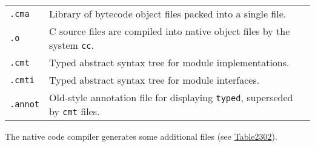 \begin{longtable}[]{@{}ll@{}}
\begin{minipage}[t]{0.52\columnwidth}\raggedright
\passthrough{\lstinline!.cma!}\strut
\end{minipage} & \begin{minipage}[t]{0.42\columnwidth}\raggedright
Library of bytecode object files packed into a single file.\strut
\end{minipage}\tabularnewline
\begin{minipage}[t]{0.52\columnwidth}\raggedright
\passthrough{\lstinline!.o!}\strut
\end{minipage} & \begin{minipage}[t]{0.42\columnwidth}\raggedright
C source files are compiled into native object files by the system
\passthrough{\lstinline!cc!}.\strut
\end{minipage}\tabularnewline
\begin{minipage}[t]{0.52\columnwidth}\raggedright
\passthrough{\lstinline!.cmt!}\strut
\end{minipage} & \begin{minipage}[t]{0.42\columnwidth}\raggedright
Typed abstract syntax tree for module implementations.\strut
\end{minipage}\tabularnewline
\begin{minipage}[t]{0.52\columnwidth}\raggedright
\passthrough{\lstinline!.cmti!}\strut
\end{minipage} & \begin{minipage}[t]{0.42\columnwidth}\raggedright
Typed abstract syntax tree for module interfaces.\strut
\end{minipage}\tabularnewline
\begin{minipage}[t]{0.52\columnwidth}\raggedright
\passthrough{\lstinline!.annot!}\strut
\end{minipage} & \begin{minipage}[t]{0.42\columnwidth}\raggedright
Old-style annotation file for displaying
\passthrough{\lstinline!typed!}, superseded by
\passthrough{\lstinline!cmt!} files.\strut
\end{minipage}\tabularnewline
\bottomrule
\end{longtable}

The native code compiler generates some additional files (see
\href{compiler-backend.html\#Table2302}{Table2302}).

